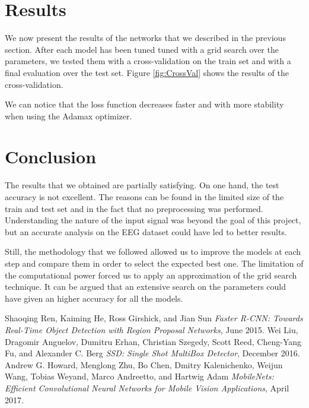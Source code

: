 \documentclass[10pt,conference,compsocconf]{IEEEtran}
\begin{document}
\section{Results}
\label{sec:results}
We now present the results of the networks that we described in the previous section. After each model has been tuned tuned with a grid search over the parameters, we tested them with a cross-validation on the train set and with a final evaluation over the test set. Figure \ref{fig:CrossVal} shows the results of the cross-validation.

We can notice that the loss function decreases faster and with more stability when using the Adamax optimizer.

\section{Conclusion}
\label{sec:conclusion}
The results that we obtained are partially satisfying. On one hand, the test accuracy is not excellent. The reasons can be found in the limited size of the train and test set and in the fact that no preprocessing was performed. Understanding the nature of the input signal was beyond the goal of this project, but an accurate analysis on the EEG dataset could have led to better results.

Still, the methodology that we followed allowed us to improve the models at each step and compare them in order to select the expected best one. The limitation of the computational power forced us to apply an approximation of the grid search technique. It can be argued that an extensive search on the parameters could have given an higher accuracy for all the models.


\begin{thebibliography}{1}
\label{reference0}
Shaoqing Ren, Kaiming He, Ross Girshick, and Jian Sun \emph{Faster R-CNN: Towards Real-Time Object
Detection with Region Proposal Networks}, June 2015.
\vspace*{-0.8\baselineskip}
\label{reference1}
Wei Liu, Dragomir Anguelov, Dumitru Erhan, Christian Szegedy, Scott Reed, Cheng-Yang Fu, and Alexander C. Berg \emph{SSD: Single Shot MultiBox Detector}, December 2016.
\vspace*{-0.8\baselineskip}
\label{reference2}
Andrew G. Howard, Menglong Zhu, Bo Chen, Dmitry Kalenichenko, Weijun Wang, Tobias Weyand, Marco Andreetto, and Hartwig Adam \emph{MobileNets: Efficient Convolutional Neural Networks for Mobile Vision Applications}, April 2017.
\end{thebibliography}
\end{document}
